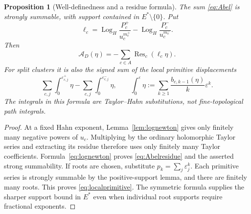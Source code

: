 \documentclass[11pt,letterpaper]{article}
\numberwithin{equation}{section}
\newtheorem{proposition}[theorem]{Proposition}
\theoremstyle{definition}
\theoremstyle{remark}
\newcommand{\Res}{\operatorname{Res}}
\newcommand{\Log}{\operatorname{Log}_{H}}
\newcommand{\eps}{\varepsilon}
\begin{document}
\begin{proposition}[Well-definedness and a residue formula]
\label{prop:Abelresidue}
The sum \eqref{eq:Abel} is strongly summable, with support contained in
$E^*\setminus\{0\}$. Put
\[
 \ell_c=\Log\frac{P_c^+}{u_c^{m_c^+}}
                  -\Log\frac{P_c^-}{u_c^{m_c^-}}.
\]
Then
\begin{equation}
 \mathcal A_D(\eta)=-\sum_{c\in A}\Res_c(\ell_c\eta).
 \label{eq:Abelresidue}
\end{equation}
For split clusters it is also the signed sum of the local primitive
displacements
\begin{equation}
 \sum_{c,j}\int_0^{\eps_{c,j}^+}\eta
       -\sum_{c,j}\int_0^{\eps_{c,j}^-}\eta,
 \qquad
 \int_0^\eps\eta:=
       \sum_{k\ge1}\frac{b_{c,k-1}(\eta)}k\eps^k.
 \label{eq:localprimitive}
\end{equation}
The integrals in this formula are Taylor--Hahn substitutions, not
fine-topological path integrals.
\end{proposition}
\begin{proof}
At a fixed Hahn exponent, Lemma~\ref{lem:lognewton} gives only finitely
many negative powers of $u_c$. Multiplying by the ordinary holomorphic
Taylor series and extracting its residue therefore uses only finitely
many Taylor coefficients. Formula~\eqref{eq:lognewton} proves
\eqref{eq:Abelresidue} and the asserted strong summability.
If roots are chosen, substitute $p_k=\sum_j\eps_j^k$.
Each primitive series is strongly summable by the positive-support
lemma, and there are finitely many roots. This proves
\eqref{eq:localprimitive}. The symmetric formula supplies the sharper
support bound in $E^*$ even when individual root supports require
fractional exponents.
\end{proof}
\end{document}
